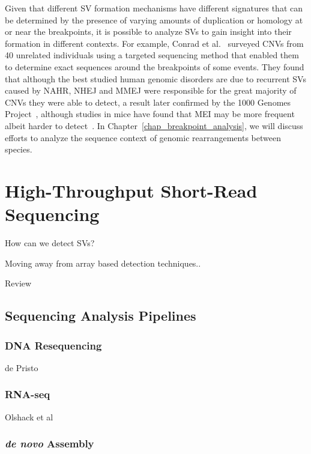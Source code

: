 Given that different SV formation mechanisms have different signatures that can be determined by the presence of varying amounts of duplication or homology at or near the breakpoints, it is possible to analyze SVs to gain insight into their formation in different contexts. For example, Conrad et al.~\cite{Conrad:2010if} surveyed CNVs from 40 unrelated individuals using a targeted sequencing method that enabled them to determine exact sequences around the breakpoints of some events. They found that although the best studied human genomic disorders are due to recurrent SVs caused by NAHR, NHEJ and MMEJ were responsible for the great majority of CNVs they were able to detect, a result later confirmed by the 1000 Genomes Project~\cite{Mills:2011p1611}, although studies in mice have found that MEI may be more frequent albeit harder to detect~\cite{Yalcin:2011tm}.  In Chapter~\ref{chap_breakpoint_analysis}, we will discuss efforts to analyze the sequence context of genomic rearrangements between species.

\section{High-Throughput Short-Read Sequencing}

How can we detect SVs?

Moving away from array based detection techniques..

Review~\cite{Shendure:2008jh}

\subsection{Sequencing Analysis Pipelines}\label{section_pipelines}

\subsubsection{DNA Resequencing}

de Pristo\cite{DePristo:2011fo}

\subsubsection{RNA-seq}

Olshack et al\cite{Oshlack:2010kr}

\subsubsection{\emph{de novo} Assembly}

